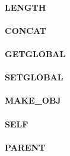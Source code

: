 \documentclass[12pt,a4paper]{article}
\begin{document}
\vspace{2em}\begin{minipage}{\textwidth}
\paragraph{LENGTH}
\end{minipage}

\vspace{2em}\begin{minipage}{\textwidth}
\paragraph{CONCAT}
\end{minipage}

\vspace{2em}\begin{minipage}{\textwidth}
\paragraph{GETGLOBAL}
\end{minipage}

\vspace{2em}\begin{minipage}{\textwidth}
\paragraph{SETGLOBAL}
\end{minipage}

\vspace{2em}\begin{minipage}{\textwidth}
\paragraph{MAKE\_OBJ}
\end{minipage}

\vspace{2em}\begin{minipage}{\textwidth}
\paragraph{SELF}
\end{minipage}

\vspace{2em}\begin{minipage}{\textwidth}
\paragraph{PARENT}
\end{minipage}
\end{document}

